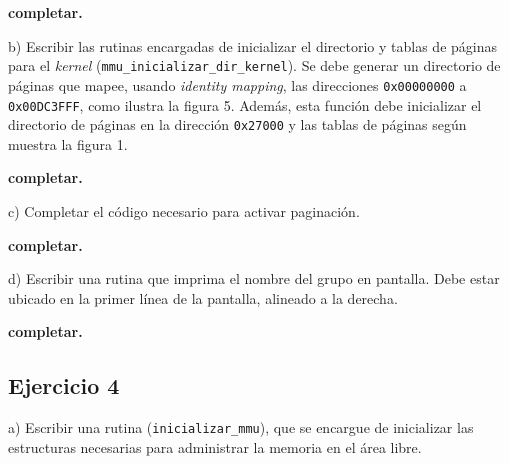 \vspace*{0.3cm}

\textbf{completar.}

\vspace*{0.5cm} \noindent



\noindent
b) Escribir las rutinas encargadas de inicializar el directorio y tablas de páginas para el \textit{kernel}\newline
(\verb|mmu_inicializar_dir_kernel|). Se debe generar un directorio de páginas que mapee, usando \textit{identity mapping}, 
las direcciones \verb|0x00000000| a \verb|0x00DC3FFF|, como ilustra la figura 5. Además, esta función debe inicializar
el directorio de páginas en la dirección \verb|0x27000| y las tablas de páginas según muestra la figura 1.

\vspace*{0.3cm}

\textbf{completar.}

\vspace*{0.5cm} \noindent



\noindent
c) Completar el código necesario para activar paginación.

\vspace*{0.3cm}

\textbf{completar.}

\vspace*{0.5cm} \noindent



\noindent
d) Escribir una rutina que imprima el nombre del grupo en pantalla. Debe estar ubicado en la primer línea
de la pantalla, alineado a la derecha.

\vspace*{0.3cm}

\textbf{completar.}

\vspace*{0.5cm} \noindent



\newpage





\subsection*{Ejercicio 4}

\noindent
a) Escribir una rutina (\verb|inicializar_mmu|), que se encargue de inicializar las estructuras necesarias para administrar la memoria en el área libre.

